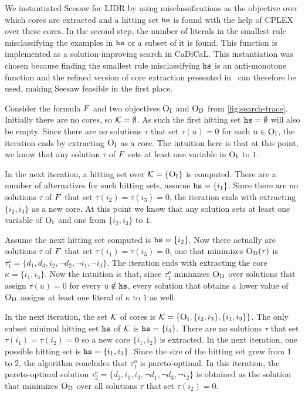 We instantiated Seesaw for LIDR by using misclassifications as the objective over which cores are extracted and a hitting set $\texttt{hs}$ is found with the help of CPLEX over these cores.
In the second step, the number of literals in the smallest rule misclassifying the examples in $\texttt{hs}$ or a subset of it is found.
This function is implemented as a solution-improving search  in CaDiCaL.
This instantiation was chosen because finding the smallest rule misclassifying $\texttt{hs}$ is an anti-monotone function and the refined version of core extraction presented in~\textcite{DBLP:conf/cp/JanotaMSM21} can therefore be used, making Seesaw feasible in the first place.

\begin{example}
  Consider the formula $F$ and two objectives $\textsc{O}_{\text{I}}$ and $\textsc{O}_{\text{D}}$ from \cref{fig:search-trace}. 
  Initially there are no cores, so $\mathcal{K} = \emptyset$. As such the first hitting set $\texttt{hs} = \emptyset$ will also be empty.
  Since there are no solutions $\tau$ that set $\tau(u) = 0$ for each $u \in \textsc{O}_{\text{I}}$, the iteration ends by extracting $\textsc{O}_{\text{I}}$ as a core. 
  The intuition here is that at this point, we know that any solution $\tau$ of $F$ sets at least one variable in $\textsc{O}_{\text{I}}$ to $1$.

  In the next iteration, a hitting set over $\mathcal{K} = \{ \textsc{O}_{\text{I}} \}$ is computed. There are a number of alternatives for such hitting sets, assume $\texttt{hs} = \{ i_1 \}$.
  Since there are no solutions $\tau$ of $F$ that set $\tau(i_2) = \tau(i_3) = 0$, the iteration ends with extracting $\{ i_2, i_3\}$ as a new core.
  At this point we know that any solution sets at least one variable of $\textsc{O}_{\text{I}}$ and one from $\{i_2, i_3\}$ to $1$.

  Assume the next hitting set computed is $\texttt{hs} = \{i_2\}$. Now there actually are solutions $\tau$ of $F$ that set $\tau(i_1) = \tau(i_3) = 0$, one that minimizes 
  $\textsc{O}_{\text{D}}(\tau)$ is $\tau^o_1 = \{d_1, d_3, i_2, \lnot d_2, \lnot i_1, \lnot i_3 \}$. The iteration ends with extracting the core
  $\kappa = \{i_1, i_3\}$. Now the intuition is that, since $\tau^o_1$ minimizes $\textsc{O}_{\text{D}}$ over solutions that assign $\tau(u) = 0$ for every $u \notin \texttt{hs}$, every solution that obtains a lower value of $\textsc{O}_{\text{D}}$
  assigns at least one literal of $\kappa$ to $1$ as well. 

  In the next iteration, the set $\mathcal{K}$ of cores is $\mathcal{K} = \{ \textsc{O}_{\text{I}}, \{i_2, i_3\}, \{i_1, i_3\}\}$. The only subset minimal hitting set $\texttt{hs}$ of $\mathcal{K}$ is $\texttt{hs} = \{i_3\}$.
  There are no solutions $\tau$ that set $\tau(i_1) = \tau(i_2) = 0$ so a new core $\{i_1, i_2\}$ is extracted. 
  In the next iteration, one possible hitting set is $\texttt{hs} = \{i_1, i_3\}$. Since the size of the hitting set grew from $1$ to $2$, the algorithm concludes that $\tau^o_1$ is pareto-optimal. 
  In this iteration, the pareto-optimal solution $\tau^o_2 = \{d_2, i_1, i_3, \lnot d_1, \lnot d_3, \lnot i_2 \}$ is obtained 
  as the solution that minimizes $\textsc{O}_{\text{D}}$ over all solutions $\tau$ that set $\tau(i_2) = 0$.  


\end{example}
